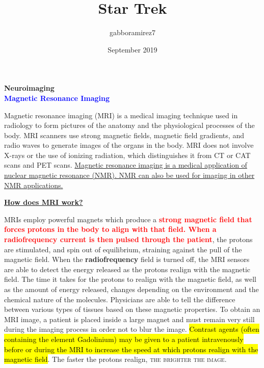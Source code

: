 \documentclass[12pt, a3paper]{article}
\title{\Huge\textbf{Star Trek}}
\author{gabboramirez7}
\date{September 2019}
\begin{document}
    \begin{center}
        {\selectfont
        \Huge\textbf{Neuroimaging}
        }\\
        \vspace{0.3cm}
        {\selectfont
        \huge\textbf{\textcolor{blue}{Magnetic Resonance Imaging}}
        }\\
    \end{center}
    
    \vspace{0.5cm}
   Magnetic resonance imaging (MRI) is a medical imaging technique used in radiology to form pictures of the anatomy and the physiological processes of the body. MRI scanners use strong magnetic fields, magnetic field gradients, and radio waves to generate images of the organs in the body. MRI does not involve X-rays or the use of ionizing radiation, which distinguishes it from CT or CAT scans and PET scans. \uline{Magnetic resonance imaging is a medical application of nuclear magnetic resonance (NMR). NMR can also be used for imaging in other NMR applications.}
    
    \vspace{0.5cm}
    \begin{flushleft}
         \underline{\Large\textbf{How does MRI work?}}
    \end{flushleft}
    
     MRIs employ powerful magnets which produce a \textbf{\textcolor{red}{strong magnetic field that forces protons in the body to align with that field. When a radiofrequency current is then pulsed through the patient}}, the protons are stimulated, and spin out of equilibrium, straining against the pull of the magnetic field. When the \textbf{radiofrequency} field is turned off, the MRI sensors are able to detect the energy released as the protons realign with the magnetic field. The time it takes for the protons to realign with the magnetic field, as well as the amount of energy released, changes depending on the environment and the chemical nature of the molecules. Physicians are able to tell the difference between various types of tissues based on these magnetic properties. To obtain an MRI image, a patient is placed inside a large magnet and must remain very still during the imaging process in order not to blur the image. \hl{Contrast agents (often containing the element Gadolinium) may be given to a patient intravenously before or during the MRI to increase the speed at which protons realign with the magnetic field}. The faster the protons realign, \textsc{the brighter the image}.
     
\end{document}
